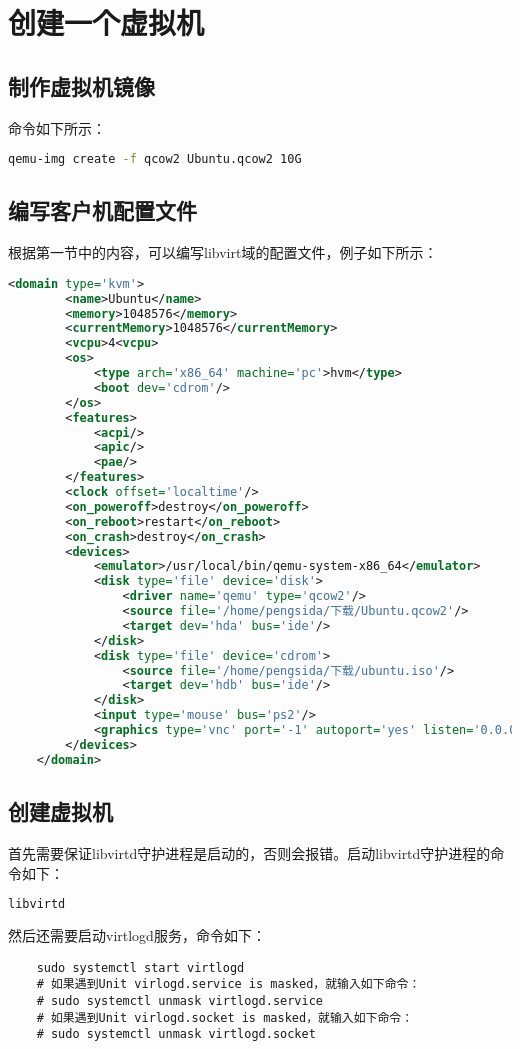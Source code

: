 \documentclass[a4paper,left=2.5cm,right=2.5cm,11pt]{article}
\begin{document}
\section{创建一个虚拟机}
\subsection{制作虚拟机镜像}
	命令如下所示：
	\begin{lstlisting}[language = bash]
	qemu-img create -f qcow2 Ubuntu.qcow2 10G
	\end{lstlisting}

\subsection{编写客户机配置文件}
	根据第一节中的内容，可以编写libvirt域的配置文件，例子如下所示：
	\begin{lstlisting}[language = XML]
	<domain type='kvm'>
		<name>Ubuntu</name>
		<memory>1048576</memory>
		<currentMemory>1048576</currentMemory>
		<vcpu>4<vcpu>
		<os>
			<type arch='x86_64' machine='pc'>hvm</type>
			<boot dev='cdrom'/>
		</os>
		<features>
			<acpi/>
			<apic/>
			<pae/>
		</features>
		<clock offset='localtime'/>
		<on_poweroff>destroy</on_poweroff>
		<on_reboot>restart</on_reboot>
		<on_crash>destroy</on_crash>
		<devices>
			<emulator>/usr/local/bin/qemu-system-x86_64</emulator>
			<disk type='file' device='disk'>
				<driver name='qemu' type='qcow2'/>
				<source file='/home/pengsida/下载/Ubuntu.qcow2'/>
				<target dev='hda' bus='ide'/>
			</disk>
			<disk type='file' device='cdrom'>
				<source file='/home/pengsida/下载/ubuntu.iso'/>
				<target dev='hdb' bus='ide'/>
			</disk>
			<input type='mouse' bus='ps2'/>
			<graphics type='vnc' port='-1' autoport='yes' listen='0.0.0.0' keymap='en-us'/>
		</devices>
	</domain>
	\end{lstlisting}

\subsection{创建虚拟机}
	首先需要保证libvirtd守护进程是启动的，否则会报错。启动libvirtd守护进程的命令如下：
	\begin{lstlisting}[language = bash]
	libvirtd
	\end{lstlisting}

	然后还需要启动virtlogd服务，命令如下：
	\begin{lstlisting}
	sudo systemctl start virtlogd
	# 如果遇到Unit virlogd.service is masked，就输入如下命令：
	# sudo systemctl unmask virtlogd.service
	# 如果遇到Unit virlogd.socket is masked，就输入如下命令：
	# sudo systemctl unmask virtlogd.socket
	\end{lstlisting}
\end{document}
